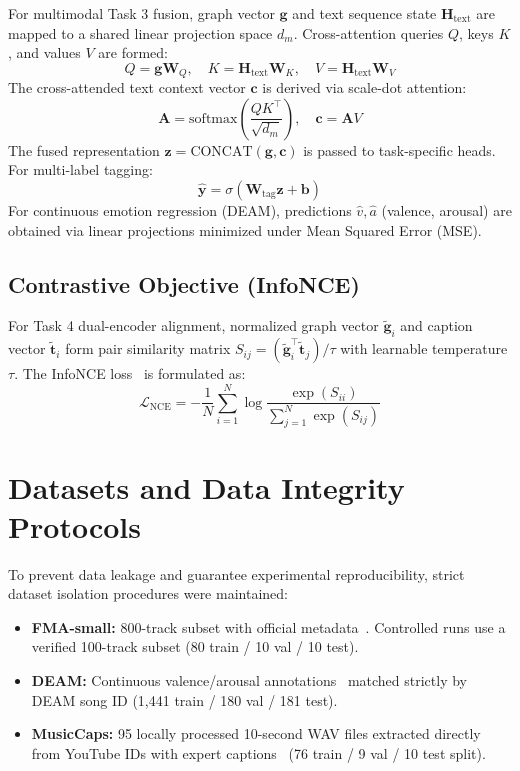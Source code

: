 \documentclass[10pt,twocolumn]{article}
\begin{document}
For multimodal Task 3 fusion, graph vector $\mathbf{g}$ and text sequence state $\mathbf{H}_{\text{text}}$ are mapped to a shared linear projection space $d_m$. Cross-attention queries $Q$, keys $K$, and values $V$ are formed:
\begin{equation}
Q = \mathbf{g} \mathbf{W}_Q, \quad K = \mathbf{H}_{\text{text}} \mathbf{W}_K, \quad V = \mathbf{H}_{\text{text}} \mathbf{W}_V
\end{equation}
The cross-attended text context vector $\mathbf{c}$ is derived via scale-dot attention:
\begin{equation}
\mathbf{A} = \text{softmax} \left( \frac{Q K^\top}{\sqrt{d_m}} \right), \quad \mathbf{c} = \mathbf{A} V
\end{equation}
The fused representation $\mathbf{z} = \text{CONCAT}(\mathbf{g}, \mathbf{c})$ is passed to task-specific heads. For multi-label tagging:
\begin{equation}
\hat{\mathbf{y}} = \sigma(\mathbf{W}_{\text{tag}} \mathbf{z} + \mathbf{b})
\end{equation}
For continuous emotion regression (DEAM), predictions $\hat{v}, \hat{a}$ (valence, arousal) are obtained via linear projections minimized under Mean Squared Error (MSE).

\subsection{Contrastive Objective (InfoNCE)}
For Task 4 dual-encoder alignment, normalized graph vector $\tilde{\mathbf{g}}_i$ and caption vector $\tilde{\mathbf{t}}_i$ form pair similarity matrix $S_{ij} = (\tilde{\mathbf{g}}_i^\top \tilde{\mathbf{t}}_j) / \tau$ with learnable temperature $\tau$. The InfoNCE loss~\cite{infonce} is formulated as:
\begin{equation}
\mathcal{L}_{\text{NCE}} = -\frac{1}{N} \sum_{i=1}^N \log \frac{\exp(S_{ii})}{\sum_{j=1}^N \exp(S_{ij})}
\end{equation}

\section{Datasets and Data Integrity Protocols}
To prevent data leakage and guarantee experimental reproducibility, strict dataset isolation procedures were maintained:
\begin{itemize}
    \item \textbf{FMA-small:} 800-track subset with official metadata~\cite{fma}. Controlled runs use a verified 100-track subset (80 train / 10 val / 10 test).
    \item \textbf{DEAM:} Continuous valence/arousal annotations~\cite{deam} matched strictly by DEAM song ID (1,441 train / 180 val / 181 test).
    \item \textbf{MusicCaps:} 95 locally processed 10-second WAV files extracted directly from YouTube IDs with expert captions~\cite{musiccaps} (76 train / 9 val / 10 test split).
\end{itemize}
\end{document}
